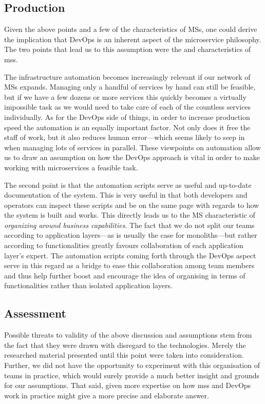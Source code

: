 \subsection{Production}

Given the above points and a few of the characteristics of MSs, one
could derive the implication that DevOps is an inherent aspect
of the microservice philosophy. The two points that lead
us to this assumption were the  and
 characteristics of \glspl{ms}.

The infrastructure automation becomes increasingly relevant if our
network of MSs expands. Managing only a handful of services by hand
can still be feasible, but if we have a few dozens or more services
this quickly becomes a virtually impossible task as we would need to
take care of each of the countless services individually. As for the
DevOps side of things, in order to increase production speed the
automation is an equally important factor. Not only does it free the
staff of work, but it also reduces human error---which seems likely to
seep in when managing lots of services in parallel. These viewpoints
on automation allow us to draw an assumption on how the DevOps
approach is vital in order to make working with microservices a
feasible task.

The second point is that the automation scripts serve as useful and
up-to-date documentation of the system. This is very useful in that
both developers and operators can inspect these scripts and be on the
same page with regards to how the system is built and works. This
directly leads us to the MS characteristic of \textit{organizing
around business capabilities}. The fact that we do not split our teams
according to application layers---as is usually the case for
monoliths---but rather according to functionalities greatly favours
collaboration of each application layer's expert. The automation
scripts coming forth through the DevOps aspect serve in this regard as
a bridge to ease this collaboration among team members and thus help
further boost and encourage the idea of organising in terms of
functionalities rather than isolated application layers.

\subsection{Assessment}

Possible threats to validity of the above discussion and assumptions
stem from the fact that they were drawn with disregard to the
technologies. Merely the researched material presented until this
point were taken into consideration.  Further, we did not have the
opportunity to experiment with this organisation of teams in practice,
which would surely provide a much better insight and grounds for our
assumptions.  That said, given more expertise on how \glspl{ms} and
DevOps work in practice might give a more precise and elaborate
answer.


